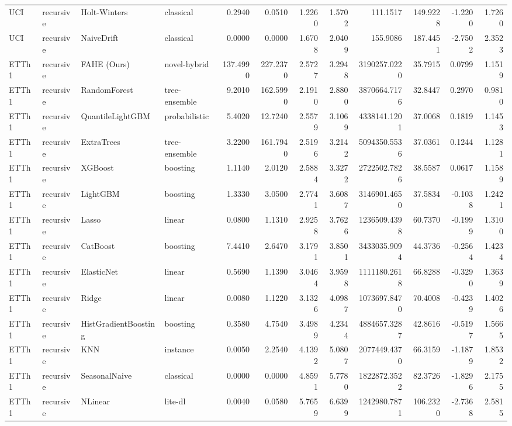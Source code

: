 \begin{tabular}{llllrrrrrrrr}
UCI & recursive & Holt-Winters & classical & 0.2940 & 0.0510 & 1.2260 & 1.5702 & 111.1517 & 149.9228 & -1.2200 & 1.7260 \\
UCI & recursive & NaiveDrift & classical & 0.0000 & 0.0000 & 1.6708 & 2.0409 & 155.9086 & 187.4451 & -2.7502 & 2.3523 \\
ETTh1 & recursive & FAHE (Ours) & novel-hybrid & 137.4990 & 227.2370 & 2.5727 & 3.2948 & 3190257.0220 & 35.7915 & 0.0799 & 1.1519 \\
ETTh1 & recursive & RandomForest & tree-ensemble & 9.2010 & 162.5990 & 2.1910 & 2.8800 & 3870664.7176 & 32.8447 & 0.2970 & 0.9810 \\
ETTh1 & recursive & QuantileLightGBM & probabilistic & 5.4020 & 12.7240 & 2.5579 & 3.1069 & 4338141.1201 & 37.0068 & 0.1819 & 1.1453 \\
ETTh1 & recursive & ExtraTrees & tree-ensemble & 3.2200 & 161.7940 & 2.5196 & 3.2142 & 5094350.5536 & 37.0361 & 0.1244 & 1.1281 \\
ETTh1 & recursive & XGBoost & boosting & 1.1140 & 2.0120 & 2.5884 & 3.3272 & 2722502.7826 & 38.5587 & 0.0617 & 1.1589 \\
ETTh1 & recursive & LightGBM & boosting & 1.3330 & 3.0500 & 2.7741 & 3.6087 & 3146901.4650 & 37.5834 & -0.1038 & 1.2421 \\
ETTh1 & recursive & Lasso & linear & 0.0800 & 1.1310 & 2.9258 & 3.7626 & 1236509.4398 & 60.7370 & -0.1999 & 1.3100 \\
ETTh1 & recursive & CatBoost & boosting & 7.4410 & 2.6470 & 3.1791 & 3.8501 & 3433035.9094 & 44.3736 & -0.2564 & 1.4234 \\
ETTh1 & recursive & ElasticNet & linear & 0.5690 & 1.1390 & 3.0464 & 3.9598 & 1111180.2618 & 66.8288 & -0.3290 & 1.3639 \\
ETTh1 & recursive & Ridge & linear & 0.0080 & 1.1220 & 3.1326 & 4.0987 & 1073697.8470 & 70.4008 & -0.4239 & 1.4026 \\
ETTh1 & recursive & HistGradientBoosting & boosting & 0.3580 & 4.7540 & 3.4989 & 4.2344 & 4884657.3287 & 42.8616 & -0.5197 & 1.5665 \\
ETTh1 & recursive & KNN & instance & 0.0050 & 2.2540 & 4.1392 & 5.0807 & 2077449.4370 & 66.3159 & -1.1879 & 1.8532 \\
ETTh1 & recursive & SeasonalNaive & classical & 0.0000 & 0.0000 & 4.8591 & 5.7780 & 1822872.3522 & 82.3726 & -1.8296 & 2.1755 \\
ETTh1 & recursive & NLinear & lite-dl & 0.0040 & 0.0580 & 5.7659 & 6.6399 & 1242980.7871 & 106.2320 & -2.7368 & 2.5815 \\

\end{tabular}
